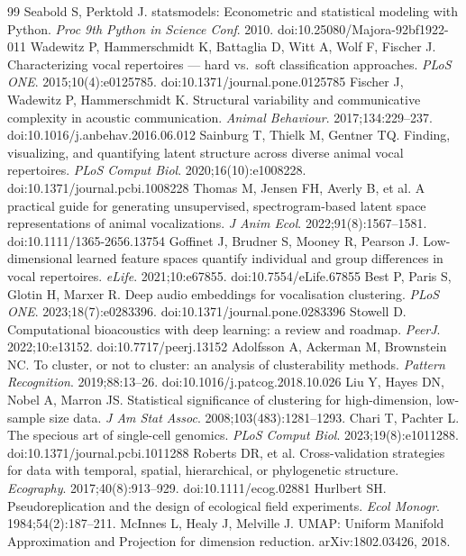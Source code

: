 \begin{thebibliography}{99}
 Seabold S, Perktold J. statsmodels: Econometric and statistical modeling with Python. \emph{Proc 9th Python in Science Conf}. 2010. doi:10.25080/Majora-92bf1922-011
 Wadewitz P, Hammerschmidt K, Battaglia D, Witt A, Wolf F, Fischer J. Characterizing vocal repertoires --- hard vs.\ soft classification approaches. \emph{PLoS ONE}. 2015;10(4):e0125785. doi:10.1371/journal.pone.0125785
 Fischer J, Wadewitz P, Hammerschmidt K. Structural variability and communicative complexity in acoustic communication. \emph{Animal Behaviour}. 2017;134:229--237. doi:10.1016/j.anbehav.2016.06.012
 Sainburg T, Thielk M, Gentner TQ. Finding, visualizing, and quantifying latent structure across diverse animal vocal repertoires. \emph{PLoS Comput Biol}. 2020;16(10):e1008228. doi:10.1371/journal.pcbi.1008228
 Thomas M, Jensen FH, Averly B, et al. A practical guide for generating unsupervised, spectrogram-based latent space representations of animal vocalizations. \emph{J Anim Ecol}. 2022;91(8):1567--1581. doi:10.1111/1365-2656.13754
 Goffinet J, Brudner S, Mooney R, Pearson J. Low-dimensional learned feature spaces quantify individual and group differences in vocal repertoires. \emph{eLife}. 2021;10:e67855. doi:10.7554/eLife.67855
 Best P, Paris S, Glotin H, Marxer R. Deep audio embeddings for vocalisation clustering. \emph{PLoS ONE}. 2023;18(7):e0283396. doi:10.1371/journal.pone.0283396
 Stowell D. Computational bioacoustics with deep learning: a review and roadmap. \emph{PeerJ}. 2022;10:e13152. doi:10.7717/peerj.13152
 Adolfsson A, Ackerman M, Brownstein NC. To cluster, or not to cluster: an analysis of clusterability methods. \emph{Pattern Recognition}. 2019;88:13--26. doi:10.1016/j.patcog.2018.10.026
 Liu Y, Hayes DN, Nobel A, Marron JS. Statistical significance of clustering for high-dimension, low-sample size data. \emph{J Am Stat Assoc}. 2008;103(483):1281--1293.
 Chari T, Pachter L. The specious art of single-cell genomics. \emph{PLoS Comput Biol}. 2023;19(8):e1011288. doi:10.1371/journal.pcbi.1011288
 Roberts DR, et al. Cross-validation strategies for data with temporal, spatial, hierarchical, or phylogenetic structure. \emph{Ecography}. 2017;40(8):913--929. doi:10.1111/ecog.02881
 Hurlbert SH. Pseudoreplication and the design of ecological field experiments. \emph{Ecol Monogr}. 1984;54(2):187--211.
 McInnes L, Healy J, Melville J. UMAP: Uniform Manifold Approximation and Projection for dimension reduction. arXiv:1802.03426, 2018.
\end{thebibliography}
